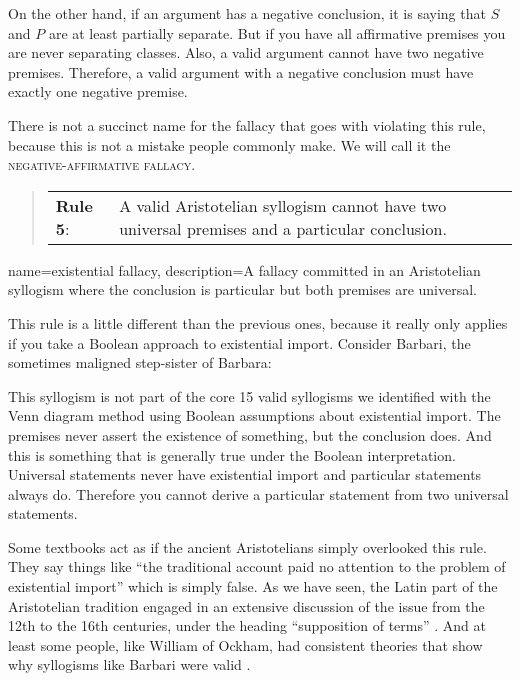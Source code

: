 On the other hand, if an argument has a negative conclusion, it is saying that $S$ and $P$ are at least partially separate. But if you have all affirmative premises you are never separating classes. Also, a valid argument cannot have two negative premises. Therefore, a valid argument with a negative conclusion must have exactly one negative premise.

There is not a succinct name for the fallacy that goes with violating this rule, because this is not a mistake people commonly make. We will call it the \textsc{\gls{negative-affirmative fallacy}}. \label{def:negative-affirmative _fallacy}

\begin{quotation}
\begin{tabu}{p{.1\linewidth}p{.9\linewidth}}
\textbf{Rule 5}: & A valid Aristotelian syllogism cannot have two universal premises and a particular conclusion.
\end{tabu} \label{rule_5}
\end{quotation}


{
name=existential fallacy,
description={A fallacy committed in an Aristotelian syllogism where the conclusion is particular but both premises are universal. }
}

This rule is a little different than the previous ones, because it really only applies if you take a Boolean approach to existential import. Consider Barbari, the sometimes maligned step-sister of Barbara:

\begin{kormanize}
\end{kormanize}

This syllogism is not part of the core 15 valid syllogisms we identified with the Venn diagram method using Boolean assumptions about existential import. The premises never assert the existence of something, but the conclusion does. And this is something that is generally true under the Boolean interpretation. Universal statements never have existential import and particular statements always do. Therefore you cannot derive a particular statement from two universal statements.

Some textbooks act as if the ancient Aristotelians simply overlooked this rule. They say things like ``the traditional account paid no attention to the problem of existential import'' which is simply false. As we have seen, the Latin part of the Aristotelian tradition engaged in an extensive discussion of the issue from the 12th to the 16th centuries, under the heading ``supposition of terms'' \citep{Read2002}. And at least some people, like William of Ockham, had consistent theories that show why syllogisms like Barbari were valid \citep{Parsons2008}.

